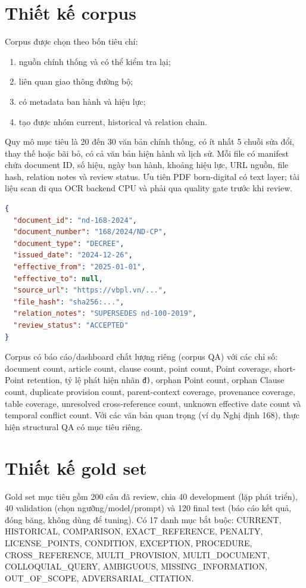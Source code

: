 \documentclass[a4paper,12pt]{extreport}
\newcommand{\code}[1]{\texttt{#1}}
\begin{document}
\section{Thiết kế corpus}

Corpus được chọn theo bốn tiêu chí:

\begin{enumerate}
  \item nguồn chính thống và có thể kiểm tra lại;
  \item liên quan giao thông đường bộ;
  \item có metadata ban hành và hiệu lực;
  \item tạo được nhóm current, historical và relation chain.
\end{enumerate}

Quy mô mục tiêu là 20 đến 30 văn bản chính thống, có ít nhất 5 chuỗi sửa đổi, thay thế hoặc bãi bỏ, có cả văn bản hiện hành và lịch sử. Mỗi file có manifest chứa document ID, số hiệu, ngày ban hành, khoảng hiệu lực, URL nguồn, file hash, relation notes và review status. Ưu tiên PDF born-digital có text layer; tài liệu scan đi qua OCR backend CPU và phải qua quality gate trước khi review.

\begin{lstlisting}[language=json,caption={Ví dụ corpus manifest rút gọn}]
{
  "document_id": "nd-168-2024",
  "document_number": "168/2024/ND-CP",
  "document_type": "DECREE",
  "issued_date": "2024-12-26",
  "effective_from": "2025-01-01",
  "effective_to": null,
  "source_url": "https://vbpl.vn/...",
  "file_hash": "sha256:...",
  "relation_notes": "SUPERSEDES nd-100-2019",
  "review_status": "ACCEPTED"
}
\end{lstlisting}

Corpus có báo cáo/dashboard chất lượng riêng (corpus QA) với các chỉ số: document count, article count, clause count, point count, Point coverage, short-Point retention, tỷ lệ phát hiện nhãn \code{đ)}, orphan Point count, orphan Clause count, duplicate provision count, parent-context coverage, provenance coverage, table coverage, unresolved cross-reference count, unknown effective date count và temporal conflict count. Với các văn bản quan trọng (ví dụ Nghị định 168), thực hiện structural QA có mục tiêu riêng.

\section{Thiết kế gold set}

\begin{sloppypar}
Gold set mục tiêu gồm 200 câu đã review, chia 40 development (lặp phát triển), 40 validation (chọn ngưỡng/model/prompt) và 120 final test (báo cáo kết quả, đóng băng, không dùng để tuning). Có 17 danh mục bắt buộc: CURRENT, HISTORICAL, COMPARISON, EXACT\_REFERENCE, PENALTY, LICENSE\_POINTS, CONDITION, EXCEPTION, PROCEDURE, CROSS\_REFERENCE, MULTI\_PROVISION, MULTI\_DOCUMENT, COLLOQUIAL\_QUERY, AMBIGUOUS, MISSING\_INFORMATION, OUT\_OF\_SCOPE, ADVERSARIAL\_CITATION.
\end{sloppypar}
\end{document}
